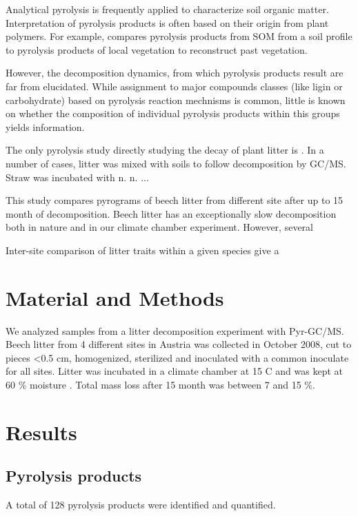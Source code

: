 \documentclass[preprint,12pt]{elsarticle}
\begin{document}
Analytical pyrolysis is frequently applied to characterize soil organic matter. Interpretation of pyrolysis products is often based on their origin from plant polymers. For example, \cite{Schellekens2007} compares pyrolysis products from SOM from a soil profile to pyrolysis products of local vegetation to reconstruct past vegetation. 

However, the decomposition dynamics, from which pyrolysis products result are far from elucidated. While assignment to major compounds classes (like ligin or carbohydrate) based on pyrolysis reaction mechnisms is common, little is known on whether the composition of individual pyrolysis products within this groups yields information. 

The only pyrolysis study directly studying the decay of plant litter is \cite{Franchini2002}. In a number of cases, litter was mixed with soils to follow decomposition by GC/MS. Straw was incubated with n. n. ...

This study compares pyrograms of beech litter from different site after up to 15 month of decomposition. Beech litter has an exceptionally slow decomposition both in nature \citep{Klotzbucher2011} and in our climate chamber experiment. However, several 

Inter-site comparison of litter traits within a given species give a 

\section{Material and Methods}

We analyzed samples from a litter decomposition experiment with Pyr-GC/MS. Beech litter from 4 different sites in Austria was collected in October 2008, cut to pieces \textless 0.5 cm, homogenized, sterilized and inoculated with a common inoculate for all sites. Litter was incubated in a climate chamber at 15 \textdegree C and was kept at 60 \% moisture \citep{Wanek2010}.
Total mass loss after 15 month was between 7 and 15 \%.

\section{Results}

\subsection{Pyrolysis products}

A total of 128 pyrolysis products were identified and quantified.
\end{document}
